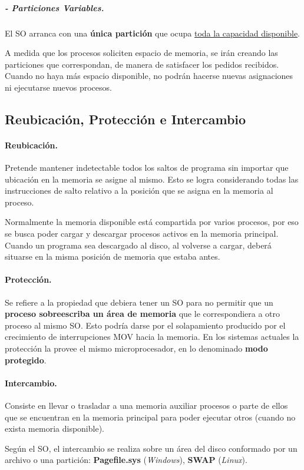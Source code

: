 \documentclass[10pt,a4paper]{article}
\begin{document}
\subparagraph{- Particiones Variables.} El SO arranca con una \textbf{única partición} que ocupa \underline{toda la capacidad disponible}. 

A medida que los procesos soliciten espacio de memoria, se irán creando las particiones que correspondan, de manera de satisfacer los pedidos recibidos. Cuando no haya más espacio disponible, no podrán hacerse nuevas asignaciones ni ejecutarse nuevos procesos.

\subsection{Reubicación, Protección e Intercambio}

\paragraph{Reubicación.} Pretende mantener indetectable todos los saltos de programa sin importar que ubicación en la memoria se asigne al mismo. Esto se logra considerando todas las instrucciones de salto relativo a la posición que se asigna en la memoria al proceso.

Normalmente la memoria disponible está compartida por varios procesos, por eso se busca poder cargar y descargar procesos activos en la memoria principal. Cuando un programa sea descargado al disco, al volverse a cargar, deberá situarse en la misma posición de memoria que estaba antes.

\paragraph{Protección.} Se refiere a la propiedad que debiera tener un SO para no permitir que un \textbf{proceso sobreescriba un área de memoria} que le correspondiera a otro proceso al mismo SO. Esto podría darse por el solapamiento producido por el crecimiento de interrupciones MOV hacia la memoria. En los sistemas actuales la protección la provee el mismo microprocesador, en lo denominado \textbf{modo protegido}.

\paragraph{Intercambio.} Consiste en llevar o trasladar a una memoria auxiliar procesos o parte de ellos que se encuentran en la memoria principal para poder ejecutar otros (cuando no exista memoria disponible).

Según el SO, el intercambio se realiza sobre un área del disco conformado por un archivo o una partición: \textbf{Pagefile.sys} (\textit{Windows}), \textbf{SWAP} (\textit{Linux}).
\end{document}
